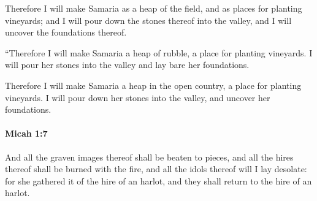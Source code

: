 			\begin{versebox}
					\item[BHS] 
					\item[LXX] 
					\item[ASV] Therefore I will make Samaria as a heap of the field, and as places for planting vineyards; and I will pour down the stones thereof into the valley, and I will uncover the foundations thereof.
					\item[NIV] “Therefore I will make Samaria a heap of rubble, a place for planting vineyards. I will pour her stones into the valley and lay bare her foundations.
					\item[NRSV] Therefore I will make Samaria a heap in the open country, a place for planting vineyards. I will pour down her stones into the valley, and uncover her foundations.
			\end{versebox}

		\paragraph{Micah 1:7} %
			\label{MICAH-1-7}

			And all the graven images thereof shall be beaten to pieces, and all the hires thereof shall be burned with the fire, and all the idols thereof will I lay desolate: for she gathered it of the hire of an harlot, and they shall return to the hire of an harlot.

